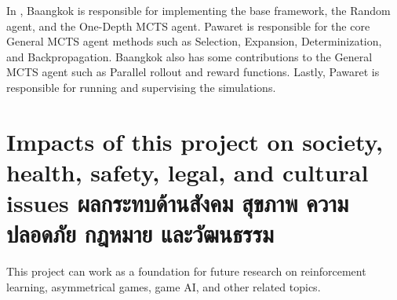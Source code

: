 In \RootAI, Baangkok is responsible for implementing the base framework, the Random agent, and the One-Depth MCTS agent. Pawaret is responsible for the core General MCTS agent methods such as Selection, Expansion, Determinization, and Backpropagation. Baangkok also has some contributions to the General MCTS agent such as Parallel rollout and reward functions. Lastly, Pawaret is responsible for running and supervising the simulations.



\section{\ifenglish%
Impacts of this project on society, health, safety, legal, and cultural issues
\else%
ผลกระทบด้านสังคม สุขภาพ ความปลอดภัย กฎหมาย และวัฒนธรรม
\fi}
This project can work as a foundation for future research on reinforcement learning, asymmetrical games, game AI, and other related topics.
